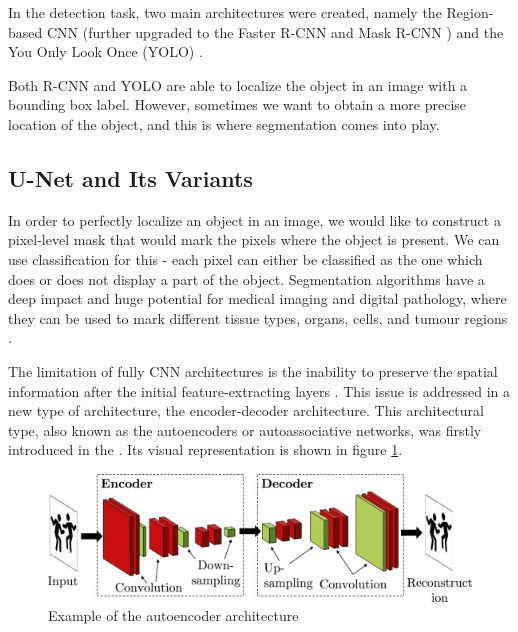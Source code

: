 In the detection task, two main architectures were created, namely the Region-based CNN \cite{Girshick2014} (further upgraded to the Faster R-CNN and Mask R-CNN \cite{Ren2017}) and the You Only Look Once (YOLO) \cite{He2017}. 

Both R-CNN and YOLO are able to localize the object in an image with a bounding box label. However, sometimes we want to obtain a more precise location of the object, and this is where segmentation comes into play.

\subsection{U-Net and Its Variants}
In order to perfectly localize an object in an image, we would like to construct a pixel-level mask that would mark the pixels where the object is present. We can use classification for this - each pixel can either be classified as the one which does or does not display a part of the object. Segmentation algorithms have a deep impact and huge potential for medical imaging and digital pathology, where they can be used to mark different tissue types, organs, cells, and tumour regions \cite{Santosh2022-3}.

The limitation of fully CNN architectures is the inability to preserve the spatial information after the initial feature-extracting layers \cite{Santosh2022-3}. This issue is addressed in a new type of architecture, the encoder-decoder architecture. This architectural type, also known as the autoencoders or autoassociative networks, was firstly introduced in the \cite{Kramer1992}. Its visual representation is shown in figure \ref{fig:autoencoder}.

\begin{figure}[H]
\begin{centering}
\includegraphics[width=12cm]{assets/images/encoder-decoder.jpg}
\par\end{centering}
\caption{Example of the autoencoder architecture \cite{Santosh2022-2}}
\label{fig:autoencoder}
\end{figure}

